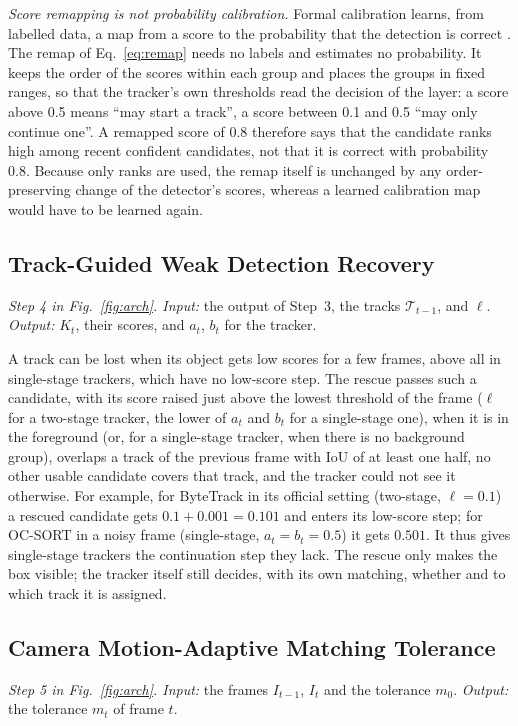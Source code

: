 \documentclass[pdflatex,sn-mathphys-num,iicol]{sn-jnl}
\begin{document}
\emph{Score remapping is not probability calibration.} Formal calibration learns, from labelled
data, a map from a score to the probability that the detection is correct \cite{kuppers2020detcalib}.
The remap of Eq.~\eqref{eq:remap} needs no labels and estimates no probability. It keeps the order
of the scores within each group and places the groups in fixed ranges, so that the tracker's own
thresholds read the decision of the layer: a score above 0.5 means ``may start a track'', a score
between 0.1 and 0.5 ``may only continue one''. A remapped score of 0.8 therefore says that the
candidate ranks high among recent confident candidates, not that it is correct with probability
0.8. Because only ranks are used, the remap itself is unchanged by any order-preserving change of
the detector's scores, whereas a learned calibration map would have to be learned again.

\subsection{Track-Guided Weak Detection Recovery}\label{sec:rescue}
\emph{Step 4 in Fig.~\ref{fig:arch}. Input:} the output of Step~3, the tracks $\mathcal{T}_{t-1}$, and $\ell$. \emph{Output:}
$K_t$, their scores, and $a_t$, $b_t$ for the tracker.

A track can be lost when its object gets low scores for a few frames, above all in single-stage
trackers, which have no low-score step. The rescue passes such a candidate, with its score raised
just above the lowest threshold of the frame ($\ell$ for a two-stage tracker, the lower of $a_t$
and $b_t$ for a single-stage one), when it is in the foreground (or, for a single-stage tracker,
when there is no background group), overlaps a track of the previous frame with IoU of at least
one half, no other usable candidate covers that track, and the tracker could not see it otherwise.
For example, for ByteTrack in its official setting (two-stage, $\ell=0.1$) a rescued candidate gets
$0.1+0.001=0.101$ and enters its low-score step; for OC-SORT in a noisy frame (single-stage,
$a_t=b_t=0.5$) it gets $0.501$. It thus gives single-stage trackers the continuation step they
lack. The rescue only makes the box
visible; the tracker itself still decides, with its own matching, whether and to which track it is
assigned.

\subsection{Camera Motion-Adaptive Matching Tolerance}\label{sec:motion}
\emph{Step 5 in Fig.~\ref{fig:arch}. Input:} the frames $I_{t-1}$, $I_t$ and the tolerance $m_0$. \emph{Output:} the tolerance
$m_t$ of frame $t$.
\end{document}

